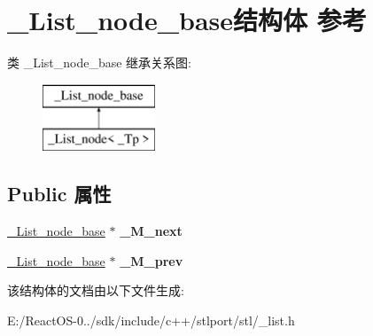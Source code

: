 \hypertarget{struct___list__node__base}{}\section{\+\_\+\+List\+\_\+node\+\_\+base结构体 参考}
\label{struct___list__node__base}
类 \+\_\+\+List\+\_\+node\+\_\+base 继承关系图\+:\begin{figure}[H]
\begin{center}
\leavevmode
\includegraphics[height=2.000000cm]{struct___list__node__base}
\end{center}
\end{figure}
\subsection*{Public 属性}
\begin{DoxyCompactItemize}
\item 
\mbox{\label{struct___list__node__base_afacf693ac3185f93a883956b33a257bc}} 
\hyperlink{struct___list__node__base}{\+\_\+\+List\+\_\+node\+\_\+base} $\ast$ {\bfseries \+\_\+\+M\+\_\+next}
\item 
\mbox{\label{struct___list__node__base_aba1818096a34749b9361ee7ddae027b6}} 
\hyperlink{struct___list__node__base}{\+\_\+\+List\+\_\+node\+\_\+base} $\ast$ {\bfseries \+\_\+\+M\+\_\+prev}
\end{DoxyCompactItemize}


该结构体的文档由以下文件生成\+:\begin{DoxyCompactItemize}
\item 
E\+:/\+React\+O\+S-\/0../sdk/include/c++/stlport/stl/\+\_\+list.\+h\end{DoxyCompactItemize}
